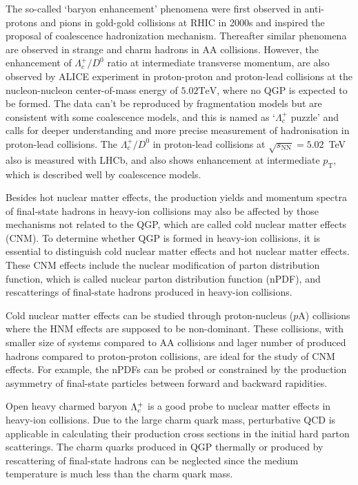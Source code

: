 The so-called `baryon enhancement' phenomena were first observed in anti-protons and pions in gold-gold collisions at RHIC in 2000s and inspired the proposal of coalescence hadronization mechanism. Thereafter similar phenomena are observed in strange and charm hadrons in AA collisions. However, the enhancement of $\Lambda_{c}^{+}/D^{0}$ ratio at intermediate transverse momentum, are also observed by ALICE experiment in proton-proton and proton-lead collisions at the nucleon-nucleon center-of-mass energy of $5.02 \mathrm{TeV}$, where no QGP is expected to be formed. The data can't be reproduced by fragmentation models but are consistent with some coalescence models, and this is named as `$\Lambda_{c}^{+}$ puzzle' and calls for deeper understanding and more precise measurement of hadronisation in proton-lead collisions. The $\Lambda_{c}^{+}/D^{0}$ in proton-lead collisions at $\sqrt{s_{\mathrm{NN}}}=5.02$~TeV also is measured with LHCb, and also shows enhancement at intermediate $p_{\mathrm{T}}$, which is described well by coalescence models.

Besides hot nuclear matter effects, the production yields and momentum spectra of final-state hadrons in heavy-ion collisions may also be affected by those mechanisms not related to the QGP, which are called cold nuclear matter effects (CNM). To determine whether QGP is formed in heavy-ion collisions, it is essential to distinguish cold nuclear matter effects and hot nuclear matter effects. These CNM effects include the nuclear modification of parton distribution function, which is called nuclear parton distribution function (nPDF), and rescatterings of final-state hadrons produced in heavy-ion collisions.

Cold nuclear matter effects can be studied through proton-nucleus ($p\mathrm{A}$) collisions where the HNM effects are supposed to be non-dominant. These collisions, with smaller size of systems compared to AA collisions and lager number of produced hadrons compared to proton-proton collisions, are ideal for the study of CNM effects. For example, the nPDFs can be probed or constrained by the production asymmetry of final-state particles between forward and backward rapidities.

Open heavy charmed baryon ${{\Lambda}^+_{c}}$ is a good probe to nuclear matter effects in heavy-ion collisions. Due to the large charm quark mass, perturbative QCD is applicable in calculating their production cross sections in the initial hard parton scatterings. The charm quarks produced in QGP thermally or produced by rescattering of final-state hadrons can be neglected since the medium temperature is much less than the charm quark mass.

